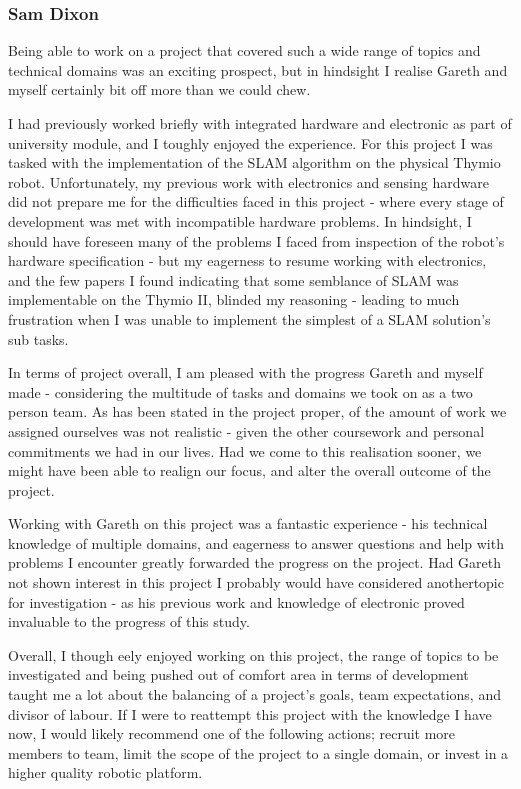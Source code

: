 \subsubsection{Sam Dixon}
Being able to work on a project that covered such a wide range of topics and
technical domains was an exciting prospect, but in hindsight I realise Gareth
and myself certainly bit off more than we could chew.

I had previously worked briefly with integrated hardware and electronic as
part of university module, and I toughly enjoyed the experience.
For this project I was tasked with the implementation of the SLAM algorithm on
the physical Thymio robot.
Unfortunately, my previous work with electronics and sensing hardware did not
prepare me for the difficulties faced in this project - where every stage of
development was met with incompatible hardware problems.
In hindsight, I should have foreseen many of the problems I faced from
inspection of the robot's hardware specification - but my eagerness to resume
working with electronics, and the few papers I found indicating that some
semblance of SLAM was implementable on the Thymio II, blinded my reasoning -
leading to much frustration when I was unable to implement the simplest of
a SLAM solution's sub tasks.

In terms of project overall, I am pleased with the progress Gareth and myself
made - considering the multitude of tasks and domains we took on as a two
person team.
As has been stated in the project proper, of the amount of work we assigned
ourselves was not realistic - given the other coursework and personal
commitments we had in our lives.
Had we come to this realisation sooner, we might have been able to realign our
focus, and alter the overall outcome of the project.

Working with Gareth on this project was a fantastic experience - his technical
knowledge of multiple domains, and eagerness to answer questions and help
with problems I encounter greatly forwarded the progress on the project.
Had Gareth not shown interest in this project I probably would have considered
anothertopic for investigation - as his previous work and knowledge of electronic
proved invaluable to the progress of this study.

Overall, I though eely enjoyed working on this project, the range of topics to
be investigated and being pushed out of comfort area in terms of development
taught me a lot about the balancing of a project's goals, team expectations,
and divisor of labour.
If I were to reattempt this project with the knowledge I have now, I would
likely recommend one of the following actions; recruit more members to team,
limit the scope of the project to a single domain, or invest in a higher
quality robotic platform.


